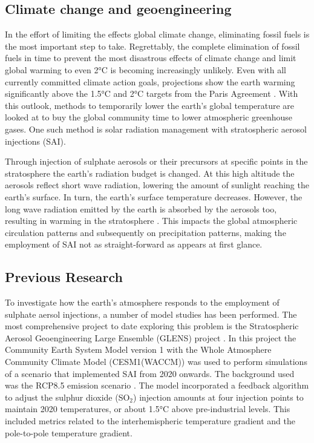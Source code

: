 \subsection{Climate change and geoengineering}
In the effort of limiting the effects global climate change, eliminating fossil fuels is the most important step to take. Regrettably, the complete elimination of fossil fuels in time to prevent the most disastrous effects of climate change and limit global warming to even 2°C is becoming increasingly unlikely. Even with all currently committed climate action goals, projections show the earth warming significantly above the 1.5°C and 2°C targets from the Paris Agreement \parencite{NDCsynth}. With this outlook, methods to temporarily lower the earth's global temperature are looked at to buy the global community time to lower atmospheric greenhouse gases. One such method is solar radiation management with stratospheric aerosol injections (SAI). 

Through injection of sulphate aerosols or their precursors at specific points in the stratosphere the earth's radiation budget is changed. At this high altitude the aerosols reflect short wave radiation, lowering the amount of sunlight reaching the earth's surface. In turn, the earth's surface temperature decreases. However, the long wave radiation emitted by the earth is absorbed by the aerosols too, resulting in warming in the stratosphere \parencite{Ammann2010}. This impacts the global atmospheric circulation patterns and subsequently on precipitation patterns, making the employment of SAI not as straight-forward as appears at first glance.  

\subsection{Previous Research}
To investigate how the earth's atmosphere responds to the employment of sulphate aersol injections, a number of model studies has been performed. The most comprehensive project to date exploring this problem is the Stratospheric Aerosol Geoengineering Large Ensemble (GLENS) project \parencite{tilmes2018}. In this project the Community Earth System Model version 1 with the Whole Atmosphere Community Climate Model (CESM1(WACCM)) was used to perform simulations of a scenario that implemented SAI from 2020 onwards. The background used was the RCP8.5 emission scenario \parencite{RIAHI2007887}. The model incorporated a feedback algorithm to adjust the sulphur dioxide (SO$_2$) injection amounts at four injection points to maintain 2020 temperatures, or about 1.5°C  above pre-industrial levels. This included metrics related to the interhemispheric temperature gradient and the pole-to-pole temperature gradient. 

